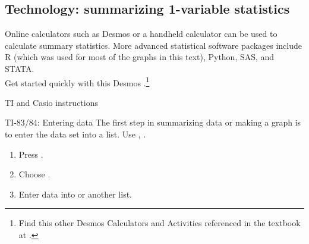 

\D{\newpage}

\subsection{Technology: summarizing 1-variable statistics}
\label{summarizedata}

\noindent Online calculators such as Desmos or a handheld calculator can be used to calculate summary statistics.  More advanced statistical software packages include R (which was used for most of the graphs in this text), Python, SAS, and STATA.\\

\noindent Get started quickly with this Desmos .\footnote{Find this other Desmos Calculators and Activities referenced in the textbook at .}

\begin{center} 
\end{center}

\noindent TI and Casio instructions

\begin{onebox}{ TI-83/84: Entering data}
The first step in summarizing data or making a graph is to  enter the data set into a list. Use , .
\begin{enumerate}
\setlength{\itemsep}{0mm}
\item Press .
\item Choose .
\item Enter data into  or another list.
\end{enumerate}
\end{onebox}



